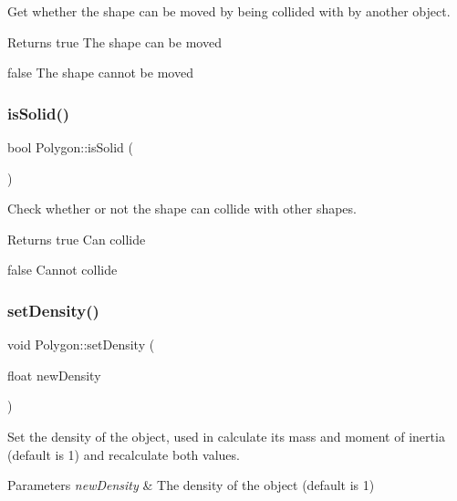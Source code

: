 Get whether the shape can be moved by being collided with by another object. 

\begin{DoxyReturn}{Returns}
true The shape can be moved 

false The shape cannot be moved 
\end{DoxyReturn}
\mbox{\label{class_polygon_a531b42b03e52789c8b9c6869933bf7d3}} 
\subsubsection{\texorpdfstring{isSolid()}{isSolid()}}
{\footnotesize\ttfamily bool Polygon\+::is\+Solid (\begin{DoxyParamCaption}{ }\end{DoxyParamCaption})}



Check whether or not the shape can collide with other shapes. 

\begin{DoxyReturn}{Returns}
true Can collide 

false Cannot collide 
\end{DoxyReturn}
\mbox{\label{class_polygon_a21749fb83e0fa8fd98cf646e0e4cbadc}} 
\subsubsection{\texorpdfstring{setDensity()}{setDensity()}}
{\footnotesize\ttfamily void Polygon\+::set\+Density (\begin{DoxyParamCaption}\item[{float}]{new\+Density }\end{DoxyParamCaption})}



Set the density of the object, used in calculate its mass and moment of inertia (default is 1) and recalculate both values. 


\begin{DoxyParams}{Parameters}
{\em new\+Density} & The density of the object (default is 1) \\
\hline
\end{DoxyParams}
\mbox{\label{class_polygon_ac379bd1b47a91b062cb1489f4be11b2e}} 
